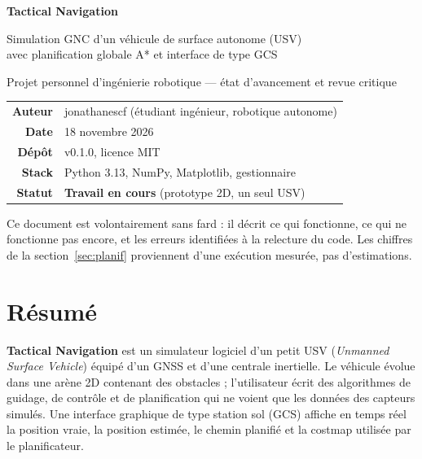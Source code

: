\documentclass[11pt,a4paper]{article}
\newcommand{\code}[1]{\texttt{\detokenize{#1}}}
\begin{document}
\begin{titlepage}
\centering
\vspace*{3.2cm}
{\Huge\bfseries Tactical Navigation\par}
\vspace{0.4cm}
{\Large Simulation GNC d'un véhicule de surface autonome (USV)\\
avec planification globale A* et interface de type GCS\par}
\vspace{1.4cm}
{\large Projet personnel d'ingénierie robotique --- état d'avancement et revue critique\par}
\vspace{2.2cm}
\begin{tabular}{rl}
\textbf{Auteur} & jonathanescf (étudiant ingénieur, robotique autonome)\\
\textbf{Date} & 18 novembre 2026\\
\textbf{Dépôt} & \code{tactical-navigation} v0.1.0, licence MIT\\
\textbf{Stack} & Python 3.13, NumPy, Matplotlib, gestionnaire \code{uv}\\
\textbf{Statut} & \textbf{Travail en cours} (prototype 2D, un seul USV)
\end{tabular}
\vfill
\begin{tcolorbox}[colback=black!4,colframe=gry,boxrule=0.4pt,width=0.88\textwidth]
\small Ce document est volontairement sans fard : il décrit ce qui fonctionne, ce qui ne fonctionne pas encore,
et les erreurs identifiées à la relecture du code. Les chiffres de la section~\ref{sec:planif} proviennent d'une
exécution mesurée, pas d'estimations.
\end{tcolorbox}
\end{titlepage}

\setcounter{tocdepth}{1}
\tableofcontents
\newpage

\section{Résumé}
\textbf{Tactical Navigation} est un simulateur logiciel d'un petit USV (\emph{Unmanned Surface Vehicle})
équipé d'un GNSS et d'une centrale inertielle. Le véhicule évolue dans une arène 2D contenant des obstacles ;
l'utilisateur écrit des algorithmes de guidage, de contrôle et de planification qui ne voient que les
données des capteurs simulés. Une interface graphique de type station sol (GCS) affiche en temps réel la
position vraie, la position estimée, le chemin planifié et la costmap utilisée par le planificateur.
\end{document}
